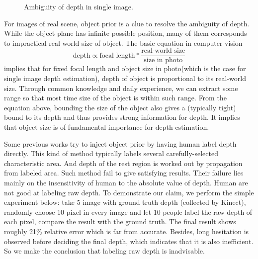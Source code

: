 \documentclass[10pt,twocolumn,letterpaper]{article}
\begin{document}
\begin{figure}[ht]
\begin{center}
\end{center}
   \caption{Ambiguity of depth in single image.}
\label{fig:long}
\label{fig:onecol}
\end{figure}

For images of real scene, object prior is a clue to resolve the ambiguity of depth. While the object plane has infinite possible position, many of them corresponds to impractical real-world size of object. The basic equation in computer vision
\begin{equation}
\text{depth} \propto \text{focal\ length} * \frac{\text{real-world\ size}} {\text{size\ in\ photo}}
\end{equation}
implies that for fixed focal length and object size in photo(which is the case for single image depth estimation), depth of object is proportional to its real-world size. Through common knowledge and daily experience, we can extract some range so that most time size of the object is within such range. From the equation above, bounding the size of the object also gives a (typically tight) bound to its depth and thus provides strong information for depth. It implies that object size is of fundamental importance for depth estimation.

Some previous works \cite{} try to inject object prior by having human label depth directly. This kind of method typically labels several carefully-selected characteristic area. And depth of the rest region is worked out by propagation from labeled area. Such method fail to give satisfying results. Their failure lies mainly on the insensitivity of human to the absolute value of depth. Human are not good at labeling raw depth. To demonstrate our claim, we perform the simple experiment below: take 5 image with ground truth depth (collected by Kinect), randomly choose 10 pixel in every image and let 10 people label the raw depth of each pixel, compare the result with the ground truth. The final result shows roughly 21\% relative error which is far from accurate. Besides, long hesitation is observed before deciding the final depth, which indicates that it is also inefficient. So we make the conclusion that labeling raw depth is inadvisable.
\end{document}
